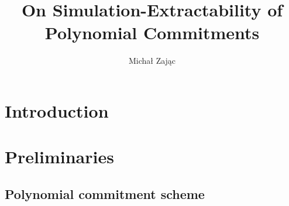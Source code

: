 \documentclass[runningheads,11pt]{llncs}
\title{On Simulation-Extractability of Polynomial Commitments}
\author{Michał Zając\inst{1}}
\institute{Clearmatics, London, UK \\
\email{m.p.zajac@gmail.com}}
\begin{document}
 \sloppy \maketitle

\begin{abstract} 
\end{abstract}

\section{Introduction}
\section{Preliminaries}
\subsection{Polynomial commitment scheme}
\end{document}

